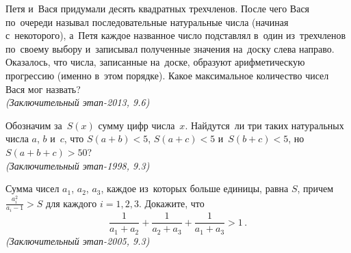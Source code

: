 \begin{problems}
\item
Петя и~Вася придумали десять квадратных трехчленов.
После чего Вася по~очереди называл последовательные натуральные числа
(начиная с~некоторого), а~Петя каждое названное число подставлял в~один
из~трехчленов по~своему выбору и~записывал полученные значения на~доску слева
направо.
Оказалось, что числа, записанные на~доске, образуют арифметическую прогрессию
(именно в~этом порядке).
Какое максимальное количество чисел Вася мог назвать?
\\\emph{(Заключительный этап-2013, 9.6)}

\item
Обозначим за~$S(x)$ сумму цифр числа~$x$.
Найдутся~ли три таких натуральных числа $a$, $b$ и~$c$, что
$S(a + b) < 5$, $S(a + c) < 5$ и~$S(b + c) < 5$, но~$S(a + b + c) > 50$?
\\\emph{(Заключительный этап-1998, 9.3)}

\item
Сумма чисел $a_1$, $a_2$, $a_3$, каждое из~которых больше единицы, равна $S$,
причем $\frac{a_i^2}{a_i - 1} > S$ для каждого $i = 1, 2, 3$.
Докажите, что
\[
    \frac{1}{a_1 + a_2} + \frac{1}{a_2 + a_3} + \frac{1}{a_1 + a_3}
>
    1
\,.\]
\emph{(Заключительный этап-2005, 9.3)}

\end{problems}

